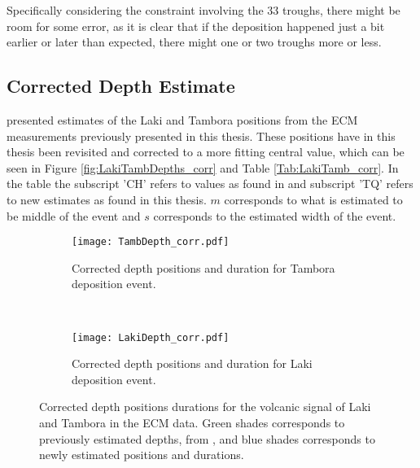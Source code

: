 \documentclass[../../CompleteThesis2/Complete_2ndDraft]{subfiles}
\begin{document}
Specifically considering the constraint involving the 33 troughs, there might be room for some error, as it is clear that if the deposition happened just a bit earlier or later than expected, there might one or two troughs more or less. 

\subsection[Corrected Depth]{Corrected Depth Estimate}
\label{Subsec:Data_VolcanicHorizons_CorrDepthEst}

\cite[Clausen \& Hammer, 1988]{ClausenHammer1988} presented estimates of the Laki and Tambora positions from the ECM measurements previously presented in this thesis. These positions have in this thesis been revisited and corrected to a more fitting central value, which can be seen in Figure \ref{fig:LakiTambDepths_corr} and Table \ref{Tab:LakiTamb_corr}. In the table the subscript 'CH' refers to values as found in \cite[Clausen \& Hammer, 1988]{ClausenHammer1988} and subscript 'TQ' refers to new estimates as found in this thesis. $m$ corresponds to what is estimated to be middle of the event and $s$ corresponds to the estimated width of the event.

\begin{figure}[h]
	\centering
	\begin{subfigure}{.45\textwidth}
		\centering
		\texttt{[image: TambDepth\_corr.pdf]}
		\caption[Corrected Tambora locations.]{\footnotesize Corrected depth positions and duration for Tambora deposition event.}
		\label{fig:DATA_TambDepth_corr}
	\end{subfigure}
	~
	\begin{subfigure}{.45\textwidth}
		\centering
		\texttt{[image: LakiDepth\_corr.pdf]}
		\caption[Corrected Laki locations.]{\footnotesize Corrected depth positions and duration for Laki deposition event.}
		\label{fig:DATA_LakiDepth_corr}
	\end{subfigure}
	\caption[Corrected depth positions of Laki and Tambora events.]{\small Corrected depth positions durations for the volcanic signal of Laki and Tambora in the ECM data. Green shades corresponds to previously estimated depths, from \cite[Clausen \& Hammer, 1988]{ClausenHammer1988}, and blue shades corresponds to newly estimated positions and durations.}
	\label{fig:DATA_LakiTambDepths_corr}
\end{figure}
\end{document}
